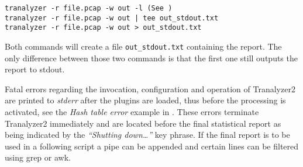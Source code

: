 \begin{center}
    {\tt tranalyzer -r file.pcap -w out -l (See )}\\
    {\tt tranalyzer -r file.pcap -w out | tee out\_stdout.txt}\\
    {\tt tranalyzer -r file.pcap -w out > out\_stdout.txt}
\end{center}

Both commands will create a file {\tt out\_stdout.txt} containing the report. The only difference between those two commands is that the first one still outputs the report to stdout.

Fatal errors regarding the invocation, configuration and operation of Tranalyzer2 are printed to {\em stderr} after the plugins are loaded, thus before the processing is activated, see the {\em Hash table error} example in . These errors terminate Tranalyzer2 immediately and are located before the final statistical report as being indicated by the {\em ``Shutting down\ldots''} key phrase. If the final report is to be used in a following script a pipe can be appended and certain lines can be filtered using grep or awk.

